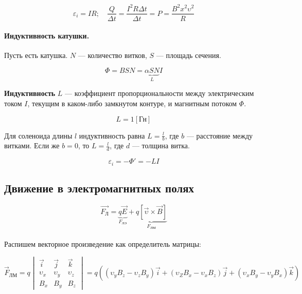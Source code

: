 \documentclass[dvipdfmx]{article}
\begin{document}
\begin{equation*}
  \varepsilon_i = IR; \quad \frac{Q}{\Delta t} = \frac{I^2R\Delta t}{\Delta t} = P = \frac{B^2x^2\upsilon^2}{R}
\end{equation*}

\paragraph{Индуктивность катушки.}

Пусть есть катушка. $N$ --- количество витков, $S$ --- площадь сечения.

\begin{equation*}
  \Phi = BSN = \underbrace{\alpha SN}_{L}I
\end{equation*}

\textbf{Индуктивность} $L$ --- коэффициент пропорциональности между электрическим током $I$, текущим в каком-либо
замкнутом контуре, и магнитным потоком $\Phi$.

\begin{equation*}
  L = 1[\text{Гн}]
\end{equation*}

Для соленоида длины $l$ индуктивность равна $L = \frac{l}{b}$, где $b$ --- расстояние между витками. Если же $b = 0$,
то $L = \frac{l}{d}$, где $d$ --- толщина витка.

\begin{equation*}
  \varepsilon_i = -\Phi' = -LI
\end{equation*}

\newpage

\subsection{Движение в электромагнитных полях}

\begin{equation*}
  \vec{F_{\text{Л}}} = \underbrace{q\vec{E}}_{F_\text{ЛЭ}} + \underbrace{q\left[\vec{\upsilon}\times\vec{B}\right]}_{F_\text{ЛМ}}
\end{equation*}
\paragraph{}

Распишем векторное произведение как определитель матрицы:

\begin{equation*}
  \vec{F}_{\text{ЛМ}}
  =
  q
  \begin{vmatrix}
    \vec{i} & \vec{j} & \vec{k}\\
    \upsilon_x & \upsilon_y & \upsilon_z\\
    B_x & B_y & B_z
  \end{vmatrix}
  =
  q\left(
  (\upsilon_yB_z - \upsilon_zB_y)\vec{i}
  +
  (\upsilon_ZB_x - \upsilon_xB_z)\vec{j}
  +
  (\upsilon_xB_y - \upsilon_yB_x)\vec{k}
  \right)
\end{equation*}
\end{document}
